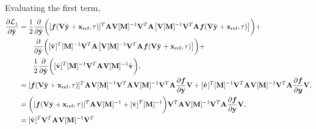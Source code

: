 \documentclass[3p,computermodern,10pt]{elsarticle}
\begin{document}
\begin{appendices}
\begin{align*}
\end{align*}
Evaluating the first term,
\begin{align*}
\frac{\partial  \objectiveControlArg{}_1 }{\partial \genstateyDiscreteArgnt{}{}} &= 
\frac{1}{2} \frac{\partial }{\partial \genstateyDiscreteArgnt{}{}} \bigg( [\velocity(\veloargsromy)]^T \stweightingMatArg{} \basisspace [\massArgnt{}]^{-1} \basisspace^T \stweightingMatArg{}  \big[ \basisspace  [\massArgnt{}]^{-1}\basisspace^T
\stweightingMatArg{}  \velocity(\veloargsromy) \big] \bigg) +  \\
& \qquad \frac{\partial }{\partial \genstateyDiscreteArgnt{}{}} \bigg( [\controllerDiscreteDumArgnt{}]^T [\massArgnt{}]^{-1} \basisspace^T \stweightingMatArg{}  \big[ \basisspace  [\massArgnt{}]^{-1}\basisspace^T
\stweightingMatArg{}  \velocity(\veloargsromy) \big] \bigg) + \\
& \qquad \frac{1}{2} \frac{\partial }{\partial \genstateyDiscreteArgnt{}{}} \bigg( [\controllerDiscreteDumArgnt{}]^T [\massArgnt{}]^{-1} \basisspace^T \stweightingMatArg{} \basisspace [\massArgnt{}]^{-1} \controllerDiscreteDumArgnt{}\bigg) 
,\\ 
&= 
[\velocity(\veloargsromy)]^T \stweightingMatArg{} \basisspace [\massArgnt{}]^{-1} \basisspace^T \stweightingMatArg{}  \basisspace  [\massArgnt{}]^{-1}\basisspace^T
\stweightingMatArg{}  \frac{\partial \velocity}{\partial \stateyDiscrete} \basisspace + 
[\controllerDumArgnt{}]^T [\massArgnt{}]^{-1} \basisspace^T \stweightingMatArg{}   \basisspace  [\massArgnt{}]^{-1}\basisspace^T
\stweightingMatArg{} \frac{\partial \velocity}{\partial \statey} \basisspace , \\ 
&= 
\bigg( [\velocity(\veloargsromy)]^T \stweightingMatArg{} \basisspace [\massArgnt{}]^{-1}  + [\controllerDiscreteDumArgnt{}]^T [\massArgnt{}]^{-1} \bigg)\basisspace^T  \stweightingMatArg{}   \basisspace  [\massArgnt{}]^{-1}\basisspace^T
\stweightingMatArg{} \frac{\partial \velocity}{\partial \stateyDiscrete} \basisspace ,\\
&= 
[\genstateyDiscreteDotArgnt{} ]^T \basisspace^T  \stweightingMatArg{}   \basisspace  [\massArgnt{}]^{-1}\basisspace^T

\end{align*}
\end{appendices}
\end{document}
